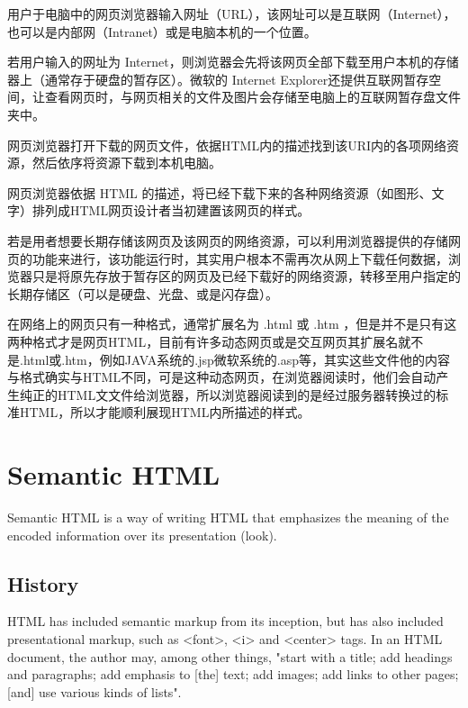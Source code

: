 \begin{compactitem}
\item 用户于电脑中的网页浏览器输入网址（URL），该网址可以是互联网（Internet），也可以是内部网（Intranet）或是电脑本机的一个位置。
\item 若用户输入的网址为 Internet，则浏览器会先将该网页全部下载至用户本机的存储器上（通常存于硬盘的暂存区）。微软的 Internet Explorer还提供互联网暂存空间，让查看网页时，与网页相关的文件及图片会存储至电脑上的互联网暂存盘文件夹中。
\item 网页浏览器打开下载的网页文件，依据HTML内的描述找到该URI内的各项网络资源，然后依序将资源下载到本机电脑。
\item 网页浏览器依据 HTML 的描述，将已经下载下来的各种网络资源（如图形、文字）排列成HTML网页设计者当初建置该网页的样式。
\item 若是用者想要长期存储该网页及该网页的网络资源，可以利用浏览器提供的存储网页的功能来进行，该功能运行时，其实用户根本不需再次从网上下载任何数据，浏览器只是将原先存放于暂存区的网页及已经下载好的网络资源，转移至用户指定的长期存储区（可以是硬盘、光盘、或是闪存盘）。
\item 在网络上的网页只有一种格式，通常扩展名为 .html 或 .htm ，但是并不是只有这两种格式才是网页HTML，目前有许多动态网页或是交互网页其扩展名就不是.html或.htm，例如JAVA系统的.jsp微软系统的.asp等，其实这些文件他的内容与格式确实与HTML不同，可是这种动态网页，在浏览器阅读时，他们会自动产生纯正的HTML文文件给浏览器，所以浏览器阅读到的是经过服务器转换过的标准HTML，所以才能顺利展现HTML内所描述的样式。
\end{compactitem}

\chapter{Semantic HTML}


Semantic HTML is a way of writing HTML that emphasizes the meaning of the encoded information over its presentation (look). 

\section{History}


HTML has included semantic markup from its inception, but has also included presentational markup, such as <font>, <i> and <center> tags.  In an HTML document, the author may, among other things, "start with a title; add headings and paragraphs; add emphasis to [the] text; add images; add links to other pages; [and] use various kinds of lists".

